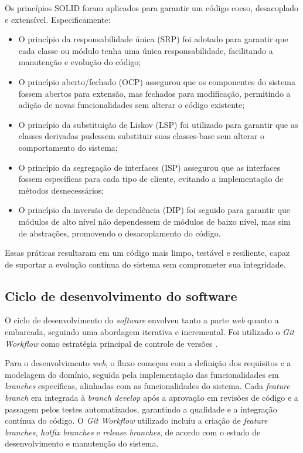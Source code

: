 Os princípios SOLID foram aplicados para garantir um código coeso, desacoplado e extensível. Especificamente:
\begin{itemize}
    \item O princípio da responsabilidade única (SRP) foi adotado para garantir que cada classe ou módulo tenha uma única responsabilidade, facilitando a manutenção e evolução do código;
    \item O princípio aberto/fechado (OCP) assegurou que os componentes do sistema fossem abertos para extensão, mas fechados para modificação, permitindo a adição de novas funcionalidades sem alterar o código existente;
    \item O princípio da substituição de Liskov (LSP) foi utilizado para garantir que as classes derivadas pudessem substituir suas classes-base sem alterar o comportamento do sistema;
    \item O princípio da segregação de interfaces (ISP) assegurou que as interfaces fossem específicas para cada tipo de cliente, evitando a implementação de métodos desnecessários;
    \item O princípio da inversão de dependência (DIP) foi seguido para garantir que módulos de alto nível não dependessem de módulos de baixo nível, mas sim de abstrações, promovendo o desacoplamento do código.
\end{itemize}

Essas práticas resultaram em um código mais limpo, testável e resiliente, capaz de suportar a evolução contínua do sistema sem comprometer sua integridade.

\subsection{Ciclo de desenvolvimento do software}

O ciclo de desenvolvimento do \textit{software} envolveu tanto a parte \textit{web} quanto a embarcada, seguindo uma abordagem iterativa e incremental. Foi utilizado o \textit{Git Workflow} como estratégia principal de controle de versões \parencite{pro_git}.

Para o desenvolvimento \textit{web}, o fluxo começou com a definição dos requisitos e a modelagem do domínio, seguida pela implementação das funcionalidades em \textit{branches} específicas, alinhadas com as funcionalidades do sistema. Cada \textit{feature branch} era integrada à \textit{branch develop} após a aprovação em revisões de código e a passagem pelos testes automatizados, garantindo a qualidade e a integração contínua do código. O \textit{Git Workflow} utilizado incluiu a criação de \textit{feature branches}, \textit{hotfix branches} e \textit{release branches}, de acordo com o estado de desenvolvimento e manutenção do sistema.

